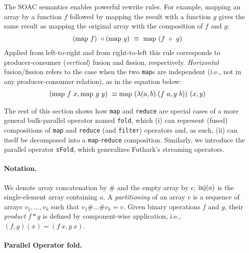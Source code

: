 The SOAC semantics enables powerful rewrite rules.  For example,
mapping an array by a function $f$ followed by mapping the result
with a function $g$ gives the same result as mapping the original
array with the composition of $f$ and $g$:
\[ \begin{array}{l}
(\mathrm{map} ~ f) ~ \circ (\mathrm{map} ~ g) ~ \equiv ~ \mathrm{map} ~ (f ~ \circ ~ g)
\end{array} \]
Applied from left-to-right and from right-to-left this
rule corresponds to producer-consumer (\textit{vertical}) fusion and fission,
respectively.
%
\textit{Horizontal} fusion/fission refers to the case when the two
\lstinline{map}s are independent (i.e., not in any producer-consumer
relation), as in the equation below:
\[ \begin{array}{l}
(\mathrm{map} ~ f ~ x, \mathrm{map} ~ g ~ y) ~ \equiv\mathrm{map} ~ (\lambda(a,b).(f~a,g~b)) ~ (x,y)
\end{array} \]


The rest of this section shows how \lstinline{map} and
\lstinline{reduce} are special cases of a more general bulk-parallel
operator named \lstinline{fold}, which (i) can represent (fused)
compositions of \lstinline{map} and \lstinline{reduce} (and
\lstinline{filter}) operators and, as such, (ii) can itself be
decomposed into a \lstinline{map}-\lstinline{reduce} composition.
Similarly, we introduce the parallel operator \lstinline{sFold}, which
generalizes Futhark's streaming operators.


\paragraph{Notation.}

We denote array concatenation by $\#$ and the empty array by $\epsilon$;
$\mathrm{inj}(a)$ is the single-element array containing $a$.
A \emph{partitioning} of an array $v$ is a sequence of arrays $v_1, \ldots, v_k$ such
that $v_1 \# \ldots \# v_k = v$.
%
Given binary operations $f$ and $g$, their \emph{product} $f * g$ is defined by
component-wise application, i.e., $(f, g) (x) = (f~x, g~x)$.
%
%

\paragraph{Parallel Operator fold.}

